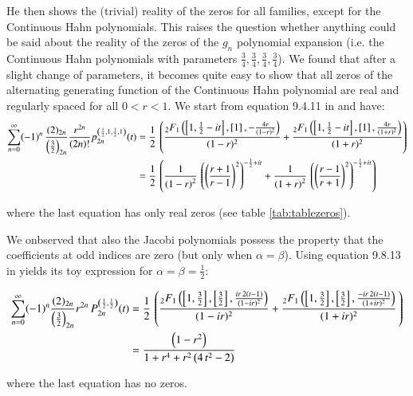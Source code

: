 \documentclass[a4paper,11pt,twoside]{amsart}
\begin{document}
\begin{itemize}
\pagebreak
He then shows the (trivial) reality of the zeros for all families, except for the Continuous Hahn polynomials. This raises the question whether anything could be said about the reality of the zeros of the $g_n$ polynomial expansion (i.e. the Continuous Hahn polynomials with parameters $\frac34, \frac34, \frac34, \frac34$). We found that after a slight change of parameters, it becomes quite easy to show that all zeros of the alternating generating function of the Continuous Hahn polynomial are real and regularly spaced for all $0 < r < 1$. We start from equation 9.4.11 in \cite{koe} and have:
\begin{align}
\sum_{n=0}^\infty (-1)^n\, \frac{(2)_{2n}}{\left(\frac32\right)_{2n}}\frac{ r^{2n}}{(2n)!}p_{2n}^{\left(\frac12,1,\frac12,1\right)}(t) &= \frac12\,\left(\frac{{}_2F_1\left(\left[1,\frac12-it\right],\left[1\right], -\frac{4r}{(1-r)^2}\right)}{(1-r)^2}+\frac{{}_2F_1\left(\left[1,\frac12-it\right],\left[1\right], \frac{4r}{(1+r)^2}\right)}{(1+r)^2} \right) \\
 & = \frac12\, \left(\frac{1}{\left(1-r \right)^{2}}\,\left(\left(\dfrac{r+1}{r -1}\right)^{2}\right)^{-\frac{1}{2}+it}+\frac{1}{{\left(1+r \right)^{2}}}\,\left(\left(\dfrac{r -1}{r+1}\right)^{2}\right)^{-\frac{1}{2}+it}\right) \notag
\end{align}

where the last equation has only real zeros (see table \ref{tab:tablezeros}).

We onbserved that also the Jacobi polynomials possess the property that the coefficients at odd indices are zero (but only when $\alpha=\beta$). Using equation 9.8.13 in \cite{koe} yields its toy expression for $\alpha=\beta=\frac12$:

\begin{align}
\sum_{n=0}^\infty (-1)^n \frac{(2)_{2n}}{\left(\frac32\right)_{2n}}r^{2n}\,P_{2n}^{\left(\frac12,\frac12\right)}(t) &= \frac12\,\left(\frac{{}_2F_1\left(\left[1,\frac32\right],\left[\frac32\right],\frac{ir\,2(t-1)}{(1-ir)^2}\right)}{(1-ir)^2}+\frac{{}_2F_1\left(\left[1,\frac32\right],\left[\frac32\right], \frac{-ir\,2(t-1)}{(1+ir)^2}\right)}{(1+ir)^2}\, \right) \\
  & = \frac{\left(1-r^2\right)}{1+r^4+r^2\left(4\,t^2-2\right)} \notag
\end{align}

where the last equation has no zeros.


\end{itemize}
\end{document}
